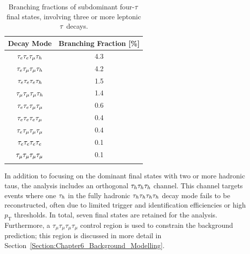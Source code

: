 \begin{table}[h]
\centering
\renewcommand{\arraystretch}{1.5} %
\setlength{\tabcolsep}{12pt} %
\begin{tabular}{|c|c|}
\hline
Decay Mode                  & Branching Fraction {[}\%{]} \\ \hline \hline
$\tau_e \tau_e \tau_{\mu} \tau_h$             & 4.3 \\ 
\arrayrulecolor{lightgray} \hline
$\tau_e \tau_{\mu} \tau_{\mu} \tau_h$                    & 4.2 \\ 
\arrayrulecolor{lightgray} \hline
$\tau_e \tau_e \tau_{e} \tau_h$                        & 1.5  \\ 
\arrayrulecolor{lightgray} \hline
$\tau_{\mu} \tau_{\mu} \tau_{\mu} \tau_h$                  & 1.4  \\ 
\arrayrulecolor{lightgray} \hline
$\tau_e \tau_e \tau_{\mu} \tau_{\mu}$             & 0.6  \\ 
\arrayrulecolor{lightgray} \hline
$\tau_e \tau_e \tau_{e} \tau_{\mu}$                     & 0.4  \\ 
\arrayrulecolor{lightgray} \hline
$\tau_e \tau_{\mu} \tau_{\mu} \tau_{\mu}$             & 0.4  \\ 
\arrayrulecolor{lightgray} \hline
$\tau_e \tau_e \tau_{e} \tau_e$                  & 0.1  \\ 
\arrayrulecolor{lightgray} \hline
$\tau_{\mu} \tau_{\mu} \tau_{\mu} \tau_{\mu}$                  & 0.1  \\ 
\arrayrulecolor{black} \hline
\end{tabular}
\caption[Branching fractions of subdominant four-$\PGt$ decay modes]{Branching fractions of subdominant four-$\PGt$ final states, involving three or more leptonic $\PGt$ decays.}
\label{Table:Chapter6_4tau_decayModes_BF_Other}
\end{table}

In addition to focusing on the dominant final states with two or more hadronic taus, the analysis includes an orthogonal $\tau_h\tau_h\tau_h$ channel. This channel targets events where one $\tau_h$ in the fully hadronic $\tau_h\tau_h\tau_h\tau_h$ decay mode fails to be reconstructed, often due to limited trigger and identification efficiencies or high $p_\text{T}$ thresholds. In total, seven final states are retained for the analysis. Furthermore, a $\tau_\mu\tau_\mu\tau_\mu\tau_\mu$ control region is used to constrain the background prediction; this region is discussed in more detail in Section~\ref{Section:Chapter6_Background_Modelling}.

